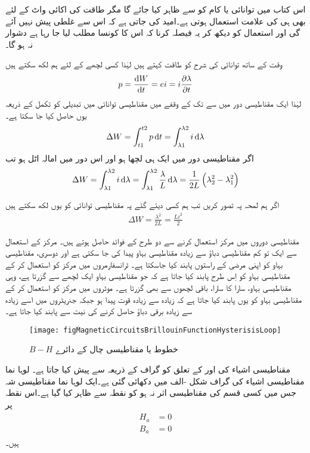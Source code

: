 اس کتاب میں توانائی یا کام کو  سے ظاہر کیا جائے گا مگر طاقت کی اکائی واٹ  کے لئے بھی ہی کی علامت استعمال ہوتی ہے۔امید کی جاتی ہے کہ اس سے غلطی پیش نہیں آئے گی اور استعمال کو دیکھ کر یہ فیصلہ کرنا کہ اس کا کونسا مطلب لیا جا رہا ہے دشوار نہ ہو گا۔

وقت کے ساتھ توانائی کی شرح کو طاقت کہتے ہیں لہٰذا کسی لچھے کے لئے ہم لکھ سکتے ہیں
\begin{align}
p=\frac{\dif W}{\dif t} = e i = i \frac{\partial \lambda}{\partial t}
\end{align} 
لہٰذا ایک مقناطیسی دور میں   سے  تک کے وقفے میں مقناطیسی توانائی میں تبدیلی کو تکمل کے ذریعہ یوں حاصل کیا جا سکتا ہے۔
\begin{align}
\Delta W = \int_{t1}^{t2} p \dif t =\int_{\lambda1}^{\lambda2} i \dif \lambda
\end{align}
اگر مقناطیسی دور میں ایک ہی لچھا ہو اور اس دور میں امالہ اٹل ہو تب
\begin{align}
\Delta W = \int_{\lambda1}^{\lambda2} i \dif \lambda=\int_{\lambda1}^{\lambda2} \frac{\lambda}{L} \dif \lambda=\frac{1}{2 L} \left(\lambda_2^2-\lambda_1^2 \right)
\end{align}

	اگر ہم لمحہ  پہ  تصور کریں تب ہم کسی دیئے گئے  پہ مقناطیسی توانائی کو یوں لکھ سکتے ہیں
\begin{align}
\Delta W=\frac{\lambda^2}{2L}=\frac{L i^2}{2}
\end{align}

مقناطیسی دوروں میں مرکز استعمال کرنے سے دو طرح کے فوائد حاصل ہوتے ہیں۔ مرکز کے استعمال سے ایک تو کم مقناطیسی دباؤ سے زیادہ مقناطیسی بہاو پیدا کی جا سکتی ہے اور دوسری، مقناطیسی بہاو کو اپنی مرضی کے راستوں پابند کیا جاسکتا ہے۔ ٹرانسفارمروں میں مرکز کو استعمال کر کے مقناطیسی بہاو کو اِس طرح پابند کیا جاتا ہے کہ جو مقناطیسی بہاو ایک لچھے سے گزرتا ہے، وہی مقناطیسی بہاو، سارا کا سارا، باقی لچھوں سے بھی گزرتا ہے۔ موٹروں میں مرکز کو استعمال کر کے مقناطیسی بہاو کو یوں پابند کیا جاتا ہے کہ زیادہ سے زیادہ قوت پیدا ہو جبکہ جنریٹروں میں اسے زیادہ سے زیادہ برقی دباؤ حاصل کرنے کی نیت سے پابند کیا جاتا ہے۔
\begin{figure}
\centering
\texttt{[image: fig٘MagneticCircuitsBrillouinFunctionHysterisisLoop]}
\caption{$B-H$   خطوط یا مقناطیسی چال کے دائرے}
\label{شکل_مقناطیسی_چال}
\end{figure}
مقناطیسی اشیاء کی  اور  کے تعلق کو گراف کے ذریعہ سے پیش کیا جاتا ہے۔ لوہا نما مقناطیسی اشیاء کی   گراف شکل -الف میں دکھائی گئی ہے۔ایک لوہا نما مقناطیسی شہ جس میں کسی قسم کی مقناطیسی اثر نہ ہو کو نقطہ  سے ظاہر کیا گیا ہے۔اس نقطہ پر
\begin{gather}
\begin{aligned}
H_a&=0\\
B_a&=0
\end{aligned}
\end{gather}
ہیں۔

